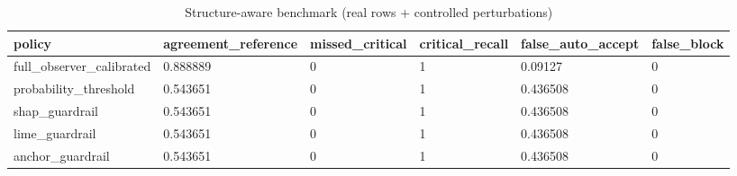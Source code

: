 \begin{table}[h]
\centering
\caption{Structure-aware benchmark (real rows + controlled perturbations)}
\label{tab:structure\_aware}
\begin{tabular}{|l|l|l|l|l|l|}
\hline
policy & agreement\_reference & missed\_critical & critical\_recall & false\_auto\_accept & false\_block \\
\hline
full\_observer\_calibrated & 0.888889 & 0 & 1 & 0.09127 & 0 \\
\hline
probability\_threshold & 0.543651 & 0 & 1 & 0.436508 & 0 \\
\hline
shap\_guardrail & 0.543651 & 0 & 1 & 0.436508 & 0 \\
\hline
lime\_guardrail & 0.543651 & 0 & 1 & 0.436508 & 0 \\
\hline
anchor\_guardrail & 0.543651 & 0 & 1 & 0.436508 & 0 \\
\hline
\end{tabular}
\end{table}
